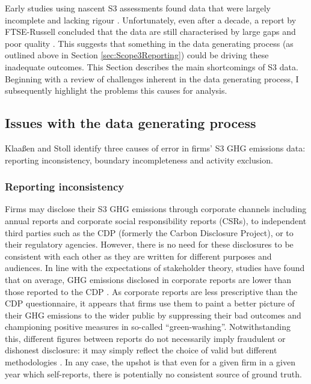 \documentclass[12pt,twoside]{report}
\begin{document}
Early studies using nascent S3 assessments found data that were largely incomplete and lacking rigour \cite{DownieStubbs2013}. Unfortunately, even after a decade, a report by FTSE-Russell concluded that the data are still characterised by large gaps and poor quality \cite{ftserussell2024}. This suggests that something in the data generating process (as outlined above in Section \ref{sec:Scope3Reporting}) could be driving these inadequate outcomes. This Section describes the main shortcomings of S3 data. Beginning with a review of challenges inherent in the data generating process, I subsequently highlight the problems this causes for analysis. 

\subsection{Issues with the data generating process}\label{sec:DataGenIssues}

Klaaßen and Stoll \cite{klassenstoll2021} identify three causes of error in firms' S3 GHG emissions data: reporting inconsistency, boundary incompleteness and activity exclusion. 

\subsubsection{Reporting inconsistency}

Firms may disclose their S3 GHG emissions through corporate channels including annual reports and corporate social responsibility reports (CSRs), to independent third parties such as the CDP (formerly the Carbon Disclosure Project), or to their regulatory agencies. However, there is no need for these disclosures to be consistent with each other as they are written for different purposes and audiences. In line with the expectations of stakeholder theory, studies have found that on average, GHG emissions disclosed in corporate reports are lower than those reported to the CDP \cite{depoers2016, klassenstoll2021}. As corporate reports are less prescriptive than the CDP questionnaire, it appears that firms use them to paint a better picture of their GHG emissions to the wider public by suppressing their bad outcomes and championing positive measures in so-called ``green-washing''. Notwithstanding this, different figures between reports do not necessarily imply fraudulent or dishonest disclosure: it may simply reflect the choice of valid but different methodologies \cite{depoers2016}. In any case, the upshot is that even for a given firm in a given year which self-reports, there is potentially no consistent source of ground truth. 
\end{document}
